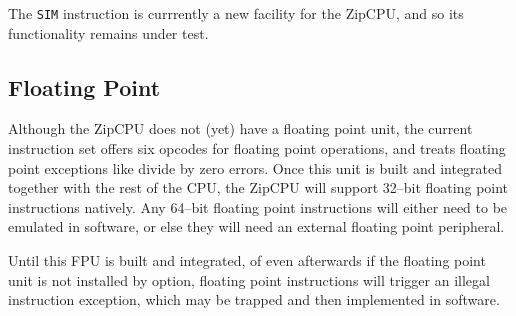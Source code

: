 \documentclass{gqtekspec}
\begin{document}
The {\tt SIM} instruction is currrently a new facility for the ZipCPU, and
so its functionality remains under test.

\subsection{Floating Point}
Although the ZipCPU does not (yet) have a floating point unit, the current
instruction set offers six opcodes for floating point operations, and treats
floating point exceptions like divide by zero errors.  Once this unit is built
and integrated together with the rest of the CPU, the ZipCPU will support
32--bit floating point instructions natively.  Any 64--bit floating point
instructions will either need to be emulated in software, or else they will
need an external floating point peripheral.

Until this FPU is built and integrated, of even afterwards if the floating
point unit is not installed by option, floating point instructions will
trigger an illegal instruction exception, which may be trapped and then
implemented in software.
\end{document}

